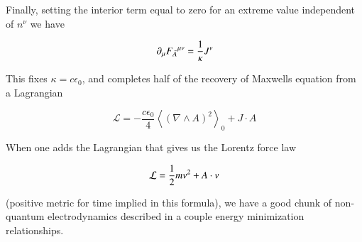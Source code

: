 \documentclass{article}
\newcommand{\LL}[0]{\mathcal{L}}
\newcommand{\gpgrade}[2] {{\left\langle{{#1}}\right\rangle}_{#2}}
\newcommand{\gpgradezero}[1] {\gpgrade{#1}{0}}
\newcommand{\grad}[0]{\nabla}
\newcommand{\barA}[0]{\bar{A}}
\begin{document}
Finally, setting the interior term equal to zero for an extreme value independent of $n^{\nu}$ we have

\begin{equation*}
\partial_{\mu} {F_{\barA}}^{\mu\nu} = \inv{\kappa} J^{\nu}
\end{equation*}

This fixes $\kappa = c \epsilon_0$, and completes half of the recovery of Maxwells equation from a Lagrangian

\begin{equation}
\LL = -\frac{c \epsilon_0}{4} \gpgradezero{(\grad \wedge A)^2} + J \cdot A
\end{equation}

When one adds the Lagrangian that gives us the Lorentz force law

\begin{equation*}
\LL = \inv{2}m v^2 + A \cdot v
\end{equation*}

(positive metric for time implied in this formula), we have a good chunk of non-quantum electrodynamics described in a couple energy minimization relationships.

\end{document}
